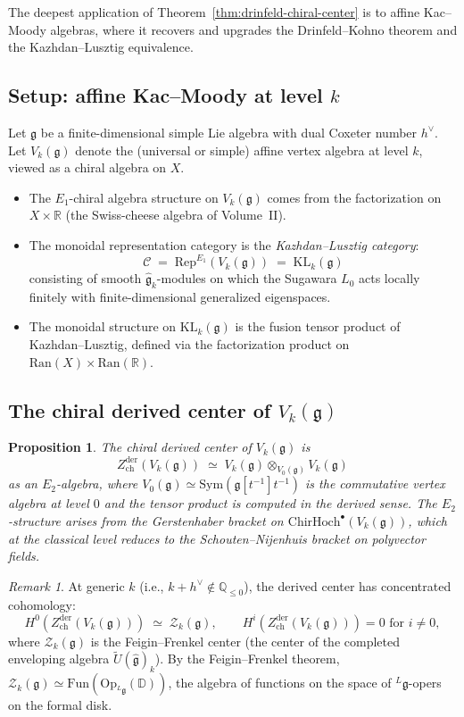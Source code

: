 \documentclass[11pt]{article}
\newtheorem{proposition}[theorem]{Proposition}
\theoremstyle{definition}
\theoremstyle{remark}
\newtheorem{remark}[theorem]{Remark}
\newcommand{\Rep}{\mathrm{Rep}}
\newcommand{\Ran}{\mathrm{Ran}}
\newcommand{\ChirHoch}{\mathrm{ChirHoch}}
\newcommand{\Sym}{\mathrm{Sym}}
\newcommand{\cC}{\mathcal{C}}
\newcommand{\cZ}{\mathcal{Z}}
\newcommand{\frakg}{\mathfrak{g}}
\newcommand{\KL}{\mathrm{KL}}
\newcommand{\Zder}{Z^{\mathrm{der}}_{\mathrm{ch}}}
\newcommand{\Fun}{\mathrm{Fun}}
\begin{document}
The deepest application of Theorem~\ref{thm:drinfeld-chiral-center} is to affine Kac--Moody algebras, where it recovers and upgrades the Drinfeld--Kohno theorem and the Kazhdan--Lusztig equivalence.

\subsection{Setup: affine Kac--Moody at level $k$}

Let $\frakg$ be a finite-dimensional simple Lie algebra with dual Coxeter number $h^\vee$. Let $V_k(\frakg)$ denote the (universal or simple) affine vertex algebra at level $k$, viewed as a chiral algebra on $X$.

\begin{itemize}
 \item The $E_1$-chiral algebra structure on $V_k(\frakg)$ comes from the factorization on $X \times \mathbb{R}$ (the Swiss-cheese algebra of Volume~II).
 \item The monoidal representation category is the \emph{Kazhdan--Lusztig category}:
 \[
 \cC \;=\; \Rep^{E_1}(V_k(\frakg)) \;=\; \KL_k(\frakg)
 \]
 consisting of smooth $\hat{\frakg}_k$-modules on which the Sugawara $L_0$ acts locally finitely with finite-dimensional generalized eigenspaces.
 \item The monoidal structure on $\KL_k(\frakg)$ is the fusion tensor product of Kazhdan--Lusztig, defined via the factorization product on $\Ran(X) \times \Ran(\mathbb{R})$.
\end{itemize}

\subsection{The chiral derived center of $V_k(\frakg)$}

\begin{proposition}
\label{prop:zder-affine}
The chiral derived center of $V_k(\frakg)$ is
\[
 \Zder(V_k(\frakg)) \;\simeq\; V_k(\frakg) \otimes_{V_0(\frakg)} V_k(\frakg)
\]
as an $E_2$-algebra, where $V_0(\frakg) \simeq \Sym(\frakg[t^{-1}]t^{-1})$ is the commutative vertex algebra at level $0$ and the tensor product is computed in the derived sense. The $E_2$-structure arises from the Gerstenhaber bracket on $\ChirHoch^\bullet(V_k(\frakg))$, which at the classical level reduces to the Schouten--Nijenhuis bracket on polyvector fields.
\end{proposition}

\begin{remark}
At generic $k$ (i.e., $k + h^\vee \notin \mathbb{Q}_{\leq 0}$), the derived center has concentrated cohomology:
\[
 H^0(\Zder(V_k(\frakg))) \;\simeq\; \cZ_k(\frakg), \qquad H^i(\Zder(V_k(\frakg))) = 0 \text{ for } i \neq 0,
\]
where $\cZ_k(\frakg)$ is the Feigin--Frenkel center (the center of the completed enveloping algebra $\tilde{U}(\hat{\frakg})_k$). By the Feigin--Frenkel theorem, $\cZ_k(\frakg) \simeq \Fun(\mathrm{Op}_{{}^L\!\frakg}(\mathbb{D}))$, the algebra of functions on the space of ${}^L\frakg$-opers on the formal disk.
\end{remark}
\end{document}
